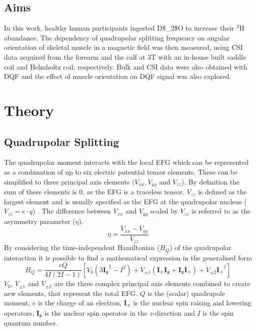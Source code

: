 \subsection{Aims}

In this work, healthy human participants ingested \ac{D$_2$O} to increase their $^2$H abundance. The dependency of quadrupolar splitting frequency on angular orientation of skeletal muscle in a magnetic field was then measured, using \ac{CSI} data acquired from the forearm and the calf at 3T with an in-house built saddle coil and Helmholtz coil, respectively. Bulk and \ac{CSI} data were also obtained with \ac{DQF} and the effect of muscle orientation on \ac{DQF} signal was also explored.

\section{Theory}
\subsection{Quadrupolar Splitting}

The quadrupolar moment interacts with the local \ac{EFG} which can be represented as a combination of up to six electric potential tensor elements. These can be simplified to three principal axis elements ($V_{xx}, V_{yy}$ and $V_{zz}$). By definition the sum of these elements is 0, as the \ac{EFG} is a traceless tensor. $V_{zz}$ is defined as the largest element and is usually specified as the \ac{EFG} at the quadrupolar nucleus ($V_{zz} = e\cdot q$) \cite{Elliott2021WhatMedia}. The difference between $V_{xx}$ and $V_{yy}$ scaled by $V_{zz}$ is referred to as the asymmetry parameter ($\eta$).
\begin{equation}
    \eta = \frac{V_{xx}-V_{yy}}{V_{zz}}
\end{equation}
By considering the time-independent Hamiltonian ($H_Q$) of the quadrupolar interaction it is possible to find a mathematical expression in the generalised form
\begin{equation}
    H_Q = \frac{eQ}{4I(2I-1)}[V_0(3\boldsymbol{I_z}^2-I^2) + V_{\pm1}(\boldsymbol{I_{\mp}I_z}+\boldsymbol{I_zI_\mp})+V_{\pm2}\boldsymbol{I_\mp}^2]
\end{equation}
$V_0$, $V_{\pm1}$ and $V_{\pm2}$ are the three complex principal axis elements combined to create new elements, that represent the total \ac{EFG}. $Q$ is the (scalar) quadrupole moment, $e$ is the charge of an electron, $\boldsymbol{I_\mp}$ is the nuclear spin raising and lowering operators, $\boldsymbol{I_z}$ is the nuclear spin operator in the $z$-direction and $I$ is the spin quantum number. 

